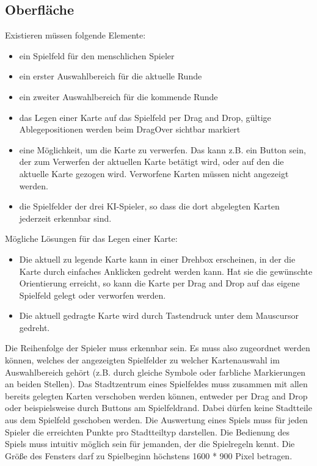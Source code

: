 \subsection{Oberfläche}
Existieren müssen folgende Elemente:
\begin{itemize}
	\item ein Spielfeld für den menschlichen Spieler
	\item ein erster Auswahlbereich für die aktuelle Runde
	\item ein zweiter Auswahlbereich für die kommende Runde
	\item das Legen einer Karte auf das Spielfeld per Drag and Drop, gültige Ablegepositionen werden beim DragOver sichtbar markiert
	\item eine Möglichkeit, um die Karte zu verwerfen. Das kann z.B. ein Button sein, der zum Verwerfen der aktuellen 	Karte betätigt wird, oder auf den die aktuelle Karte gezogen wird. Verworfene Karten müssen nicht angezeigt werden.
	\item die Spielfelder der drei KI-Spieler, so dass die dort abgelegten Karten jederzeit erkennbar sind.
\end{itemize}
Mögliche Lösungen für das Legen einer Karte:
\begin{itemize}
	\item Die aktuell zu legende Karte kann in einer Drehbox erscheinen, in der die Karte durch einfaches Anklicken gedreht werden kann. Hat sie die gewünschte Orientierung erreicht, so kann die Karte per Drag and Drop auf das eigene Spielfeld gelegt oder verworfen werden.
	\item Die aktuell gedragte Karte wird durch Tastendruck unter dem Mauscursor gedreht.
\end{itemize}
Die Reihenfolge der Spieler muss erkennbar sein. Es muss also zugeordnet werden können, welches der angezeigten Spielfelder zu welcher Kartenauswahl im Auswahlbereich gehört (z.B. durch gleiche Symbole oder farbliche Markierungen an beiden Stellen).
Das Stadtzentrum eines Spielfeldes muss zusammen mit allen bereits gelegten Karten verschoben werden können, entweder per Drag and Drop oder beispielsweise durch Buttons am Spielfeldrand. Dabei dürfen keine Stadtteile aus dem Spielfeld geschoben werden.
Die Auswertung eines Spiels muss für jeden Spieler die erreichten Punkte pro Stadtteiltyp darstellen.
Die Bedienung des Spiels muss intuitiv möglich sein für jemanden, der die Spielregeln kennt.
Die Größe des Fensters darf zu Spielbeginn höchstens 1600 * 900 Pixel betragen.

